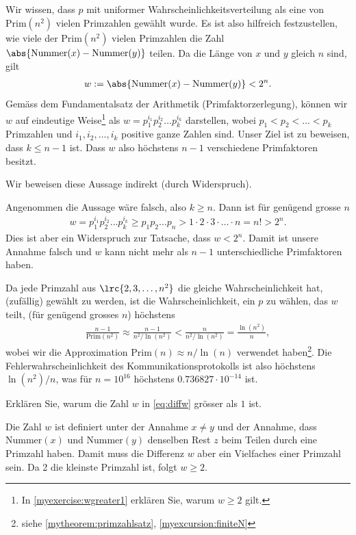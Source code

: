 \begin{aenum}
	Wir wissen, dass $p$ mit uniformer Wahrscheinlichkeitsverteilung als eine von $\text{Prim}(n^2)$ vielen Primzahlen gewählt wurde. Es ist also hilfreich festzustellen, wie viele der $\text{Prim}(n^2)$ vielen Primzahlen die Zahl $\abs{\text{Nummer}(x)-\text{Nummer}(y)}$ teilen. Da die Länge von $x$ und $y$ gleich $n$ sind, gilt
	\begin{align}\label{eq:diffw}
		w := \abs{\text{Nummer}(x)-\text{Nummer}(y)} < 2^n.
	\end{align}
	Gemäss dem Fundamentalsatz der Arithmetik (Primfaktorzerlegung), können wir $w$ auf eindeutige Weise\footnote{In \cref{myexercise:wgreater1} erklären Sie, warum $w\geq 2$ gilt.} als $w = p_1^{i_1}p_2^{i_2}\ldots p_k^{i_k}$ darstellen, wobei $p_1<p_2<\ldots<p_k$ Primzahlen  und $i_1, i_2,\ldots ,i_k$ positive ganze Zahlen sind. Unser Ziel ist zu beweisen, dass $k\leq n-1$ ist. Dass $w$ also höchstens $n-1$ verschiedene Primfaktoren besitzt.
	\begin{myproof}
		Wir beweisen diese Aussage indirekt (durch Widerspruch).

		Angenommen die Aussage wäre falsch, also $k\geq n$. Dann ist für genügend grosse $n$
		\begin{align*}
			w = p_1^{i_1}p_2^{i_2}\ldots p_k^{i_k} \geq p_1p_2\ldots p_n > 1\cdot 2\cdot 3\cdot \ldots \cdot n = n! > 2^n.
		\end{align*}
		Dies ist aber ein Widerspruch zur Tatsache, dass $w < 2^n$. Damit ist unsere Annahme falsch und $w$ kann nicht mehr als $n-1$ unterschiedliche Primfaktoren haben.
	\end{myproof}
	Da jede Primzahl aus $\lrc{2,3,\ldots ,n^2}$ die gleiche Wahrscheinlichkeit hat, (zufällig) gewählt zu werden, ist die Wahrscheinlichkeit, ein $p$ zu wählen, das $w$ teilt, (für genügend grosses $n$) höchstens
	\begin{align*}
		\frac{n-1}{\text{Prim}(n^2)}\approx \frac{n-1}{n^2/\ln(n^2)} < \frac{n}{n^2/\ln(n^2)} = \frac{\ln(n^2)}{n},
	\end{align*}
	wobei wir die Approximation $\text{Prim}(n)\approx n/\ln(n)$ verwendet haben\footnote{siehe \cref{mytheorem:primzahlsatz}, \cref{myexcursion:finiteN}}. Die Fehlerwahrscheinlichkeit des Kommunikationsprotokolls ist also höchstens $\ln(n^2)/n$, was für $n=10^{16}$ höchstens $0.736827\cdot 10^{-14}$ ist.
\end{aenum}
\begin{myexercise}\label{myexercise:wgreater1}
	Erklären Sie, warum die Zahl $w$ in \cref{eq:diffw} grösser als $1$ ist.
	\begin{myanswer}
		Die Zahl $w$ ist definiert unter der Annahme $x\neq y$ und der Annahme, dass $\text{Nummer}(x)$ und $\text{Nummer}(y)$ denselben Rest $z$ beim Teilen durch eine Primzahl haben. Damit muss die Differenz $w$ aber ein Vielfaches einer Primzahl sein. Da 2 die kleinste Primzahl ist, folgt $w\geq 2$.
	\end{myanswer}
\end{myexercise}

